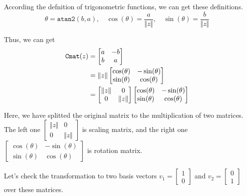 \documentclass[runningheads]{llncs}
\newcommand{\Clen}[1]{\Vert #1\Vert}
\newcommand{\bmatL}{\begin{bmatrix}}
\newcommand{\bmatR}{\end{bmatrix}}
\begin{document}
According the defnition of trigonometric functions, we can get these definitions.
\begin{equation}
  \theta=\mathtt{atan2}(b,a),\quad
  \cos(\theta)=\frac{a}{\Clen{z}},\quad
  \sin(\theta)=\frac{b}{\Clen{z}}
\end{equation}

Thus, we can get
\begin{equation}
  \begin{aligned}
    \Cmat{z}&=\bmatL a&-b\\b&a\bmatR \\
            &=\Clen{z}\bmatL \cos(\theta)&-\sin(\theta)\\\sin(\theta)&\cos(\theta)\bmatR \\
            &=\bmatL \Clen{z}&0\\0&\Clen{z}\bmatR 
              \bmatL \cos(\theta)&-\sin(\theta)\\\sin(\theta)&\cos(\theta)\bmatR 
  \end{aligned}
\end{equation}

Here, we have splitted the original matrix to the multiplication of two matrices.
The left one $\bmatL \Clen{z}&0\\0&\Clen{z}\bmatR $ is scaling matrix,
and the right one $\bmatL\cos(\theta)&-\sin(\theta)\\\sin(\theta)&\cos(\theta)\bmatR $ is rotation matrix.

Let's check the transformation to two basis vectors $v_1=\bmatL 1\\0\bmatR $ and $v_2=\bmatL 0\\1\bmatR $ over these matrices.
\end{document}
